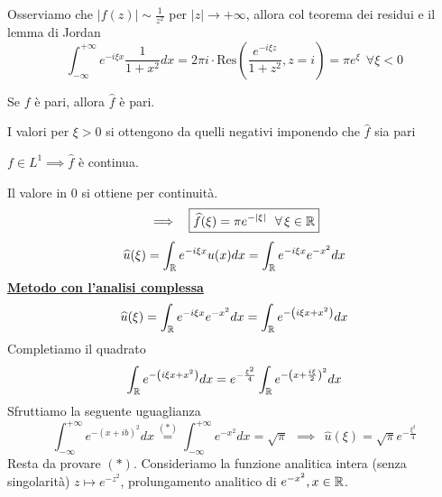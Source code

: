 \FloatBarrier

Osserviamo che $| f( z)| \sim \frac{1}{z^{2}}$ per $| z| \rightarrow +\infty $, allora col teorema dei residui e il lemma di Jordan
\begin{equation*}
\int ^{+\infty }_{-\infty } e^{-i\xi x}\frac{1}{1+x^{2}} dx=2\pi i\cdotp \mathrm{Res}\left(\frac{e^{-i\xi z}}{1+z^{2}} ,z=i\right) =\pi e^{\xi } \ \ \forall \xi < 0
\end{equation*}
\begin{rem}
Se $f$ è pari, allora $\hat{f}$ è pari.
\end{rem}
I valori per $\xi  >0$ si ottengono da quelli negativi imponendo che $\hat{f}$ sia pari
\begin{rem}
$f\in L^{1} \implies \hat{f}$ è continua.
\end{rem}
Il valore in $0$ si ottiene per continuità.
\begin{equation*}
\implies \ \ \boxed{\hat{f}( \xi ) =\pi e^{-| \xi | } \ \ \forall \xi \in \RR }
\end{equation*}
\Soluzione
\begin{equation*}
\widehat{u}( \xi ) =\int _{\mathbb{R} } e^{-i\xi x} u( x) dx=\int _{\mathbb{R} } e^{-i\xi x} e^{-x^{2}} dx
\end{equation*}
\textbf{\underline{Metodo con l'analisi complessa}}
\begin{equation*}
\widehat{u}( \xi ) =\int _{\mathbb{R} } e^{-i\xi x} e^{-x^{2}} dx=\int _{\mathbb{R} } e^{-\left( i\xi x+x^{2}\right)} dx
\end{equation*}
Completiamo il quadrato
\begin{equation*}
\int _{\mathbb{R} } e^{-\left( i\xi x+x^{2}\right)} dx=e^{-\frac{\xi ^{2}}{4}}\int _{\mathbb{R} } e^{-\left( x+\frac{i\xi }{2}\right)^{2}} dx
\end{equation*}
Sfruttiamo la seguente uguaglianza
\begin{equation*}
\int ^{+\infty }_{-\infty } e^{-( x+ib)^{2}} dx\overset{( *)}{=}\int ^{+\infty }_{-\infty } e^{-x^{2}} dx=\sqrt{\pi } \ \ \implies \ \ \boxed{\hat{u}( \xi ) =\sqrt{\pi } e^{-\frac{\xi ^{2}}{4}}}
\end{equation*}
Resta da provare $( *)$. Consideriamo la funzione analitica intera (senza singolarità) $z\mapsto e^{-z^{2}}$, prolungamento analitico di $e^{-x^{2}} ,x\in \mathbb{R} $.


